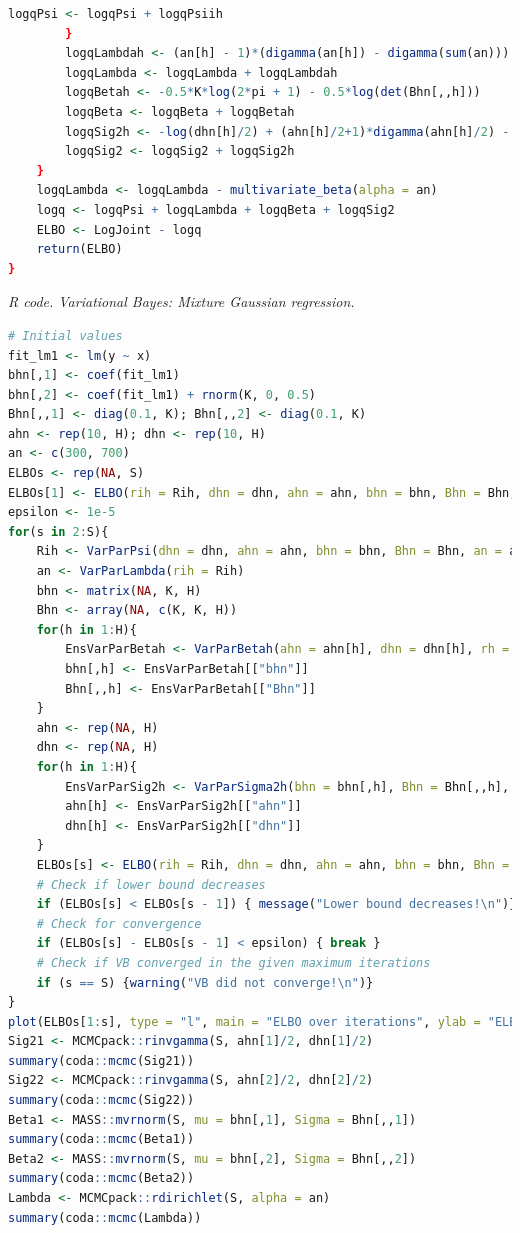 \begin{enumerate}[leftmargin=*]
\begin{tcolorbox}[enhanced,width=4.67in,center upper,
	fontupper=\large\bfseries,drop shadow southwest,sharp corners]
\begin{VF}
\begin{lstlisting}[language=R]
			logqPsi <- logqPsi + logqPsiih
		}
		logqLambdah <- (an[h] - 1)*(digamma(an[h]) - digamma(sum(an)))
		logqLambda <- logqLambda + logqLambdah
		logqBetah <- -0.5*K*log(2*pi + 1) - 0.5*log(det(Bhn[,,h])) 
		logqBeta <- logqBeta + logqBetah
		logqSig2h <- -log(dhn[h]/2) + (ahn[h]/2+1)*digamma(ahn[h]/2) - ahn[h]/2 - lgamma(ahn[h]/2)
		logqSig2 <- logqSig2 + logqSig2h
	}
	logqLambda <- logqLambda - multivariate_beta(alpha = an)
	logq <- logqPsi + logqLambda + logqBeta + logqSig2
	ELBO <- LogJoint - logq
	return(ELBO)
}
\end{lstlisting}
	\end{VF}
\end{tcolorbox}

\begin{tcolorbox}[enhanced,width=4.67in,center upper,
	fontupper=\large\bfseries,drop shadow southwest,sharp corners]
	\textit{R code. Variational Bayes: Mixture Gaussian regression.}
	\begin{VF}
		\begin{lstlisting}[language=R]
# Initial values
fit_lm1 <- lm(y ~ x)
bhn[,1] <- coef(fit_lm1)
bhn[,2] <- coef(fit_lm1) + rnorm(K, 0, 0.5) 
Bhn[,,1] <- diag(0.1, K); Bhn[,,2] <- diag(0.1, K)
ahn <- rep(10, H); dhn <- rep(10, H)
an <- c(300, 700)
ELBOs <- rep(NA, S)
ELBOs[1] <- ELBO(rih = Rih, dhn = dhn, ahn = ahn, bhn = bhn, Bhn = Bhn, an = an)
epsilon <- 1e-5
for(s in 2:S){
	Rih <- VarParPsi(dhn = dhn, ahn = ahn, bhn = bhn, Bhn = Bhn, an = an)
	an <- VarParLambda(rih = Rih)
	bhn <- matrix(NA, K, H)
	Bhn <- array(NA, c(K, K, H))
	for(h in 1:H){
		EnsVarParBetah <- VarParBetah(ahn = ahn[h], dhn = dhn[h], rh = Rih[,h])
		bhn[,h] <- EnsVarParBetah[["bhn"]]
		Bhn[,,h] <- EnsVarParBetah[["Bhn"]] 
	}
	ahn <- rep(NA, H)
	dhn <- rep(NA, H)
	for(h in 1:H){
		EnsVarParSig2h <- VarParSigma2h(bhn = bhn[,h], Bhn = Bhn[,,h], rh = Rih[,h])
		ahn[h] <- EnsVarParSig2h[["ahn"]]
		dhn[h] <- EnsVarParSig2h[["dhn"]] 
	}
	ELBOs[s] <- ELBO(rih = Rih, dhn = dhn, ahn = ahn, bhn = bhn, Bhn = Bhn, an = an)
	# Check if lower bound decreases
	if (ELBOs[s] < ELBOs[s - 1]) { message("Lower bound decreases!\n")}
	# Check for convergence
	if (ELBOs[s] - ELBOs[s - 1] < epsilon) { break }
	# Check if VB converged in the given maximum iterations
	if (s == S) {warning("VB did not converge!\n")}
}
plot(ELBOs[1:s], type = "l", main = "ELBO over iterations", ylab = "ELBO", xlab = "Iteration")
Sig21 <- MCMCpack::rinvgamma(S, ahn[1]/2, dhn[1]/2) 
summary(coda::mcmc(Sig21))
Sig22 <- MCMCpack::rinvgamma(S, ahn[2]/2, dhn[2]/2) 
summary(coda::mcmc(Sig22))
Beta1 <- MASS::mvrnorm(S, mu = bhn[,1], Sigma = Bhn[,,1])
summary(coda::mcmc(Beta1))
Beta2 <- MASS::mvrnorm(S, mu = bhn[,2], Sigma = Bhn[,,2])
summary(coda::mcmc(Beta2))
Lambda <- MCMCpack::rdirichlet(S, alpha = an)
summary(coda::mcmc(Lambda))
\end{lstlisting}
	\end{VF}
\end{tcolorbox}

\end{enumerate}